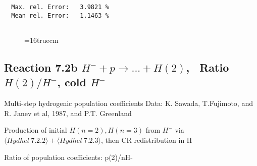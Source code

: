 \documentclass[12pt,dvipdfmx]{article}
\begin{document}
\begin{small}
\begin{verbatim}
  Max. rel. Error:   3.9821 %
  Mean rel. Error:   1.1463 %


\end{verbatim}\end{small}
\begin{figure} \label{7.2a}
\epsfxsize=16truecm
\end{figure}
\newpage


\subsection{
Reaction 7.2b $ H^- + p \rightarrow ...+ H(2) $, \   Ratio $H(2)/H^- $, cold $H^-$
}
 Multi-step hydrogenic population coefficients
 Data: K. Sawada, T.Fujimoto, \cite{kn:Sawada} and R. Janev et al, 1987, and P.T. Greenland

Production of initial $H(n=2), H(n=3)$ from $H^-$ via $ \langle Hydhel~ 7.2.2\rangle + \langle Hydhel~ 7.2.3\rangle$,
 then CR redistribution in H

 Ratio of population coefficients: p(2)/nH-
\end{document}
